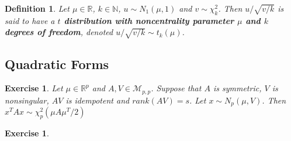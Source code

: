 \documentclass[12pt]{amsart}
\newtheorem{defn}[thm]{Definition}
\newtheorem{ex}[thm]{Exercise}
\newcommand{\N}{\mathbb{N}}
\newcommand{\R}{\mathbb{R}}
\newcommand{\MM}{\mathcal{M}}
\begin{document}
\begin{defn}
Let $\mu \in \R$, $k \in \N$, $u \sim N_1(\mu, 1)$ and $v \sim \chi^2_k$. Then $u/\sqrt{v/k}$ is said to have a \textbf{$t$ distribution with noncentrality parameter $\mu$ and $k$ degrees of freedom}, denoted $u/\sqrt{v/k} \sim t_k(\mu)$. 
\end{defn}

\subsection{Quadratic Forms}

\begin{ex}
Let $\mu \in \R^p$ and $A, V \in \MM_{p,p}$. Suppose that $A$ is symmetric, $V$ is nonsingular, $AV$ is idempotent and $rank(AV) = s$. Let $x \sim N_p(\mu, V)$. Then $x^TAx \sim \chi^2_p(\mu A \mu^T/2)$
\end{ex}

\begin{ex}

\end{ex}
\end{document}
